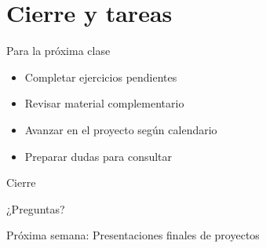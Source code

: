 \documentclass[10pt]{beamer}
\begin{document}
\section{Cierre y tareas}

\begin{frame}{Para la próxima clase}
    \begin{itemize}
        \item Completar ejercicios pendientes
        \item Revisar material complementario
        \item Avanzar en el proyecto según calendario
        \item Preparar dudas para consultar
    \end{itemize}
\end{frame}


\begin{frame}{Cierre}
    \begin{center}
        \Large{¿Preguntas?}
        
        \vspace{1cm}
        
        Próxima semana: Presentaciones finales de proyectos
    \end{center}
\end{frame}
\end{document}
